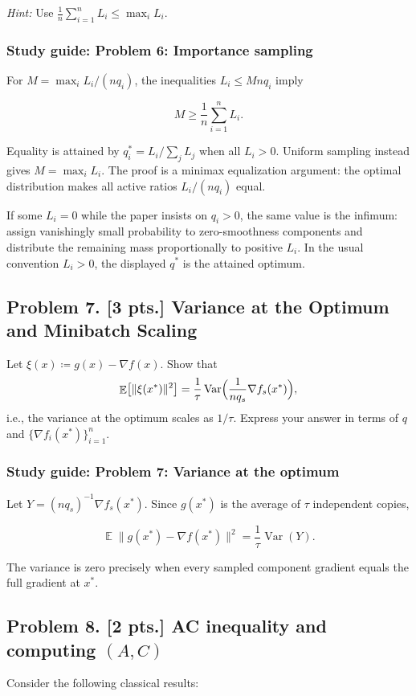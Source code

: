 \documentclass[11pt,a4paper]{article}
\DeclareMathOperator{\Var}{Var}
\DeclareMathOperator{\E}{\mathbb{E}}
\begin{document}
\textit{Hint:} Use $\frac{1}{n} \sum_{i=1}^{n} L_i \le \max_i L_i$.


\subsubsection{Study guide: Problem 6: Importance sampling}

For $M=\max_iL_i/(nq_i)$, the inequalities $L_i\leq Mnq_i$ imply

\[
M\geq\frac1n\sum_{i=1}^nL_i.
\]

Equality is attained by $q_i^*=L_i/\sum_jL_j$ when all $L_i>0$. Uniform sampling instead gives $M=\max_iL_i$. The proof is a minimax equalization argument: the optimal distribution makes all active ratios $L_i/(nq_i)$ equal.

If some $L_i=0$ while the paper insists on $q_i>0$, the same value is the infimum: assign vanishingly small probability to zero-smoothness components and distribute the remaining mass proportionally to positive $L_i$. In the usual convention $L_i>0$, the displayed $q^*$ is the attained optimum.



\subsection{Problem 7. [3 pts.] Variance at the Optimum and Minibatch Scaling}
Let $\xi(x) \coloneqq g(x) - \nabla f(x)$. Show that
\[
\E\bigl[ \|\xi(x^{*})\|^{2} \bigr] = \frac{1}{\tau} \Var\Bigl( \frac{1}{n q_s} \nabla f_s(x^{*}) \Bigr),
\]
i.e., the variance at the optimum scales as $1/\tau$. Express your answer in terms of $q$ and $\{\nabla f_i(x^{*})\}_{i=1}^{n}$.


\subsubsection{Study guide: Problem 7: Variance at the optimum}

Let $Y=(nq_s)^{-1}\nabla f_s(x^*)$. Since $g(x^*)$ is the average of $\tau$ independent copies,

\[
\E\|g(x^*)-\nabla f(x^*)\|^2
=\frac1\tau\Var(Y).
\]

The variance is zero precisely when every sampled component gradient equals the full gradient at $x^*$.



\subsection{Problem 8. [2 pts.] AC inequality and computing $(A, C)$}
Consider the following classical results:
\end{document}
